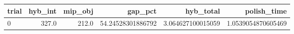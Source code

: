 \begin{tabular}{lrrrrr}
\hline
trial & hyb_int & mip_obj & gap_pct & hyb_total & polish_time \\ \hline
0 & 327.0 & 212.0 & 54.24528301886792 & 3.064627100015059 & 1.0539054870605469 \\
\hline
\end{tabular}
